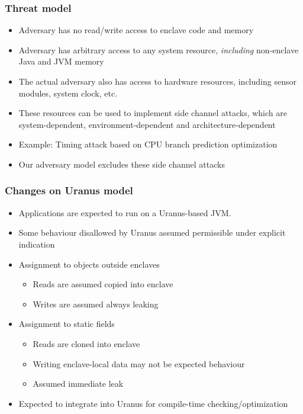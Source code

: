 \documentclass{beamer}
\begin{document}
\begin{frame}
  \frametitle{Threat model}
  \begin{itemize}
    \item Adversary has no read/write access to enclave code and memory
    \item Adversary has arbitrary access to any system resource,
      \emph{including} non-enclave Java and JVM memory
    \item The actual adversary also has access to hardware resources,
      including sensor modules, system clock, etc.
    \item These resources can be used to implement side channel attacks,
      which are system-dependent, environment-dependent and architecture-dependent
    \item Example: Timing attack based on CPU branch prediction optimization
    \item Our adversary model excludes these side channel attacks
  \end{itemize}
\end{frame}

\begin{frame}
  \frametitle{Changes on Uranus model}
  \begin{itemize}
    \item Applications are expected to run on a Uranus-based JVM.
    \item Some behaviour disallowed by Uranus assumed permissible under explicit indication
    \item Assignment to objects outside enclaves
      \begin{itemize}
        \item Reads are assumed copied into enclave
        \item Writes are assumed always leaking
      \end{itemize}
    \item Assignment to static fields
      \begin{itemize}
        \item Reads are cloned into enclave
        \item Writing enclave-local data may not be expected behaviour
        \item Assumed immediate leak
      \end{itemize}
    \item Expected to integrate into Uranus for compile-time checking/optimization
  \end{itemize}
\end{frame}
\end{document}
